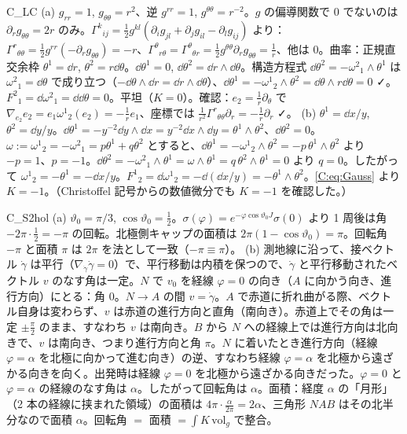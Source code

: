 \begin{soll}{C_LC}
(a) $g_{rr}=1$, $g_{\theta\theta}=r^2$、逆 $g^{rr}=1$, $g^{\theta\theta}=r^{-2}$。$g$ の偏導関数で $0$ でないのは $\partial_rg_{\theta\theta}=2r$ のみ。$\Gamma^k{}_{ij}=\frac12g^{kl}(\partial_ig_{jl}+\partial_jg_{il}-\partial_lg_{ij})$ より：$\Gamma^r{}_{\theta\theta}=\frac12g^{rr}(-\partial_rg_{\theta\theta})=-r$、$\Gamma^\theta{}_{r\theta}=\Gamma^\theta{}_{\theta r}=\frac12g^{\theta\theta}\partial_rg_{\theta\theta}=\frac1r$、他は $0$。曲率：正規直交余枠 $\theta^1=\dd r$, $\theta^2=r\dd\theta$。$\dd\theta^1=0$, $\dd\theta^2=\dd r\wedge\dd\theta$。構造方程式 $\dd\theta^2=-\omega^2{}_1\wedge\theta^1$ は $\omega^2{}_1=\dd\theta$ で成り立つ（$-\dd\theta\wedge\dd r=\dd r\wedge\dd\theta$）、$\dd\theta^1=-\omega^1{}_2\wedge\theta^2=\dd\theta\wedge r\dd\theta=0$ ✓。$F^2{}_1=\dd\omega^2{}_1=\dd\dd\theta=0$。平坦（$K=0$）。確認：$e_2=\frac1r\partial_\theta$ で $\nabla_{e_2}e_2=e_1\omega^1{}_2(e_2)=-\frac1re_1$、座標では $\frac1{r^2}\Gamma^r{}_{\theta\theta}\partial_r=-\frac1r\partial_r$ ✓。
(b) $\theta^1=\dd x/y$, $\theta^2=\dd y/y$。$\dd\theta^1=-y^{-2}\dd y\wedge\dd x=y^{-2}\dd x\wedge\dd y=\theta^1\wedge\theta^2$、$\dd\theta^2=0$。$\omega:=\omega^1{}_2=-\omega^2{}_1=p\theta^1+q\theta^2$ とすると、$\dd\theta^1=-\omega^1{}_2\wedge\theta^2=-p\,\theta^1\wedge\theta^2$ より $-p=1$、$p=-1$。$\dd\theta^2=-\omega^2{}_1\wedge\theta^1=\omega\wedge\theta^1=q\,\theta^2\wedge\theta^1=0$ より $q=0$。したがって $\omega^1{}_2=-\theta^1=-\dd x/y$。$F^1{}_2=\dd\omega^1{}_2=-\dd(\dd x/y)=-\theta^1\wedge\theta^2$。\eqref{C:eq:Gauss} より $K=-1$。（Christoffel 記号からの数値微分でも $K=-1$ を確認した。）
\end{soll}

\begin{soll}{C_S2hol}
(a) $\vartheta_0=\pi/3$, $\cos\vartheta_0=\tfrac12$。$\sigma(\varphi)=e^{-\varphi\cos\vartheta_0J}\sigma(0)$ より 1 周後は角 $-2\pi\cdot\frac12=-\pi$ の回転。北極側キャップの面積は $2\pi(1-\cos\vartheta_0)=\pi$。回転角 $-\pi$ と面積 $\pi$ は $2\pi$ を法として一致（$-\pi\equiv\pi$）。
(b) 測地線に沿って、接ベクトル $\dot\gamma$ は平行（$\nabla_{\dot\gamma}\dot\gamma=0$）で、平行移動は内積を保つので、$\dot\gamma$ と平行移動されたベクトル $v$ のなす角は一定。$N$ で $v_0$ を経線 $\varphi=0$ の向き（$A$ に向かう向き、進行方向）にとる：角 $0$。$N\to A$ の間 $v=\dot\gamma$。$A$ で赤道に折れ曲がる際、ベクトル自身は変わらず、$v$ は赤道の進行方向と直角（南向き）。赤道上でその角は一定 $\pm\frac\pi2$ のまま、すなわち $v$ は南向き。$B$ から $N$ への経線上では進行方向は北向きで、$v$ は南向き、つまり進行方向と角 $\pi$。$N$ に着いたとき進行方向（経線 $\varphi=\alpha$ を北極に向かって進む向き）の逆、すなわち経線 $\varphi=\alpha$ を北極から遠ざかる向きを向く。出発時は経線 $\varphi=0$ を北極から遠ざかる向きだった。$\varphi=0$ と $\varphi=\alpha$ の経線のなす角は $\alpha$。したがって回転角は $\alpha$。面積：経度 $\alpha$ の「月形」（2 本の経線に挟まれた領域）の面積は $4\pi\cdot\frac\alpha{2\pi}=2\alpha$、三角形 $NAB$ はその北半分なので面積 $\alpha$。回転角 $=$ 面積 $=\int K\,\mathrm{vol}_g$ で整合。
\end{soll}

